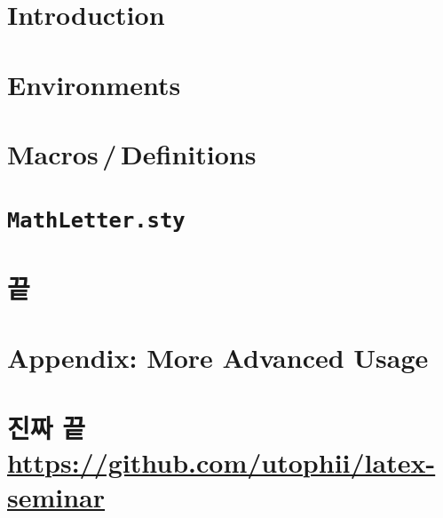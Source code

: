 \documentclass[10pt]{beamer}
\begin{document}
\begin{frame}[plain]
  \maketitle
\end{frame}

\section{Introduction}


\section{Environments}


\section{Macros\,/\,Definitions}


\section{\texttt{MathLetter.sty}}


\section{끝}

\section{Appendix: More Advanced Usage}


\def\titleoffinalslide{\texorpdfstring{진짜 끝\\\small \url{https://github.com/utophii/latex-seminar}}{진짜 끝 \small \url{https://github.com/utophii/latex-seminar}}}
\section{\titleoffinalslide}
\end{document}
